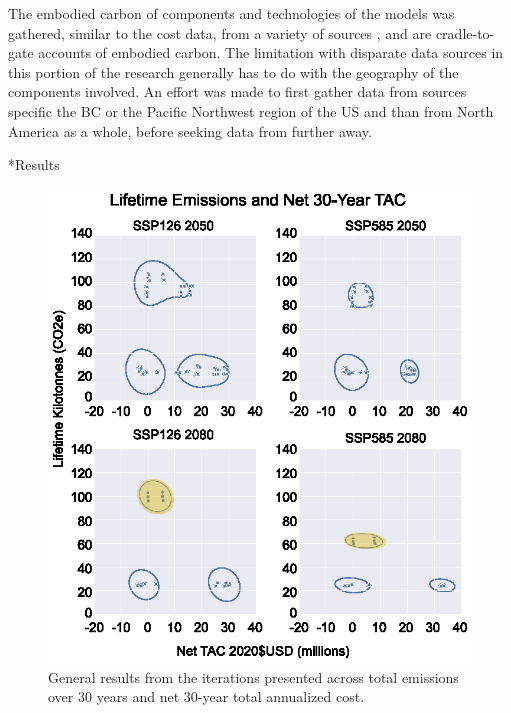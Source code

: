 \documentclass[twocolumn, a4paper,10pt]{article}
\makeatletter
\renewcommand\section{\@startsection{section}{1}{\z@}{3pt}{3pt}{\normalfont\large\bfseries}}
\makeatother
\begin{document}
The embodied carbon of components and technologies of the models was gathered, similar to the cost data, from a variety of sources \citep{jones_ice_2019, droguett_embodied_2019,c-change_labs_embodied_2020}, and are cradle-to-gate accounts of embodied carbon. The limitation with disparate data sources in this portion of the research generally has to do with the geography of the components involved. An effort was made to first gather data from sources specific the BC or the Pacific Northwest region of the US and than from North America as a whole, before seeking data from further away. 

\section*{Results}
\begin{figure}[h!]
    \centering
    \captionsetup{margin=.5cm}
    \includegraphics[scale=0.8]{figures/general_results_box.eps}
    \caption{General results from the iterations presented across total emissions over 30 years and net 30-year total annualized cost.}
    \label{fig:cross_plot}
\end{figure}
\end{document}

